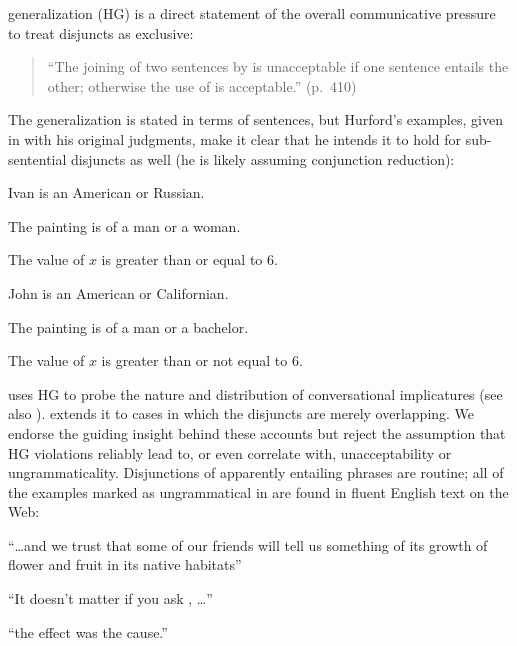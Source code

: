 \documentclass{article}
\begin{document}
 generalization (HG) is a direct statement of
the overall communicative pressure to treat disjuncts as exclusive:
%
\begin{quote}
  ``The joining of two sentences by  is unacceptable if one
  sentence entails the other; otherwise the use of  is
  acceptable.'' (p.~410)
\end{quote}
%
The generalization is stated in terms of sentences, but Hurford's
examples, given in  with his original judgments, make it clear
that he intends it to hold for sub-sentential disjuncts as well (he is
likely assuming conjunction reduction):
%
\begin{examples}
\item\label{hex}
  \begin{examples}
  \item Ivan is an American or Russian.
  \item The painting is of a man or a woman.
  \item The value of $x$ is greater than or equal to 6.
  \item\label{ex-bad1}\bad John is an American or Californian.
  \item\label{ex-bad2}\bad The painting is of a man or a bachelor.
  \item\label{ex-bad3}\bad The value of $x$ is greater than or not equal to 6.
  \end{examples}
\end{examples}

\citeauthor{Hurford:1974} uses HG to probe the nature and distribution
of conversational implicatures (see also
\citealt{Gazdar79b,ChierchiaFoxSpector08}).\citet{Singh:2008} extends
it to cases in which the disjuncts are merely overlapping. We endorse
the guiding insight behind these accounts but reject the assumption
that HG violations reliably lead to, or even correlate with,
unacceptability or ungrammaticality. Disjunctions of apparently
entailing phrases are routine; all of the examples marked as
ungrammatical in  are found in fluent English text on the Web:
%
\begin{examples}
\item\label{hex-good}
  \begin{examples}
  \item ``\ldots and we trust that some of our  friends will tell us something of its growth of
    flower and fruit in its native habitats''
  \item ``It doesn't matter if you ask , \ldots''
  \item ``the effect was 
    the cause.''
  \end{examples}
\end{examples}
\end{document}
